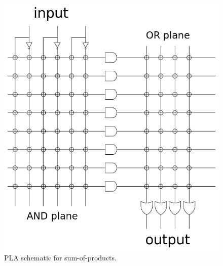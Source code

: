 \documentclass[e3_tp3_main.tex]{subfiles}
\begin{document}
\begin{figure}[h]
	\centering 
	\includegraphics[scale=0.5]{PLD.png}
	\caption{PLA schematic for sum-of-products.}
	\label{fig:PLA}
\end{figure}
\end{document}
